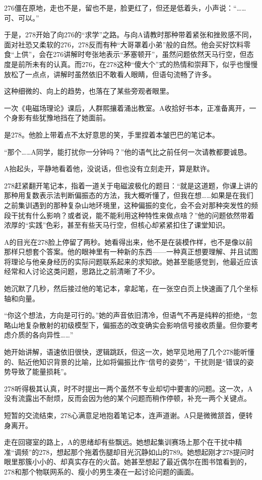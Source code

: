 \documentclass[a4paper]{book}
\begin{document}
276僵在原地，走也不是，留也不是，脸更红了，但还是低着头，小声说：“……可、可以。”

于是，278开始了向276的“求学”之路。与向A请教时那种带着紧张和挫败感不同，面对社恐又柔软的276，278反而有种“大哥罩着小弟”般的自然。他会买好饮料零食“上供”，会在276讲解时夸张地表示“茅塞顿开”，虽然问题依然天马行空，但态度是前所未有的认真。而276，在278这种“傻大个”式的热情和崇拜下，似乎也慢慢放松了一点点，讲解时虽然依旧不敢看人眼睛，但语句流畅了许多。

这种细微的、向上的趋势，也落在了某些旁观者眼里。

一次《电磁场理论》课后，人群熙攘着涌出教室。A收拾好书本，正准备离开，一个身影有些犹豫地挡在了她面前。

是278。他脸上带着点不太好意思的笑，手里捏着本皱巴巴的笔记本。

“那个……A同学，能打扰你一分钟吗？”他的语气比之前任何一次请教都要诚恳。

A抬起头，平静地看着他，没说话，但也没有立刻走开，算是默许。

278赶紧翻开笔记本，指着一道关于电磁波极化的题目：“就是这道题，你课上讲的那种用复数表示法判断偏振态的方法，我大概听懂了，但我在想……如果是在我们之前集训遇到的那种复杂山地环境里，这种偏振的变化，会不会对那种突发性的频段干扰有什么影响？或者说，能不能利用这种特性来做点啥？”他的问题依然带着浓厚的“实践”色彩，甚至有些天马行空，但核心却紧紧扣住了课堂知识。

A的目光在278脸上停留了两秒。她看得出来，他不是在装模作样，也不是像以前那样只想套个答案。他的眼神里有一种新的东西——一种真正想要理解、并且试图将理论与他亲身经历的实际问题联系起来的求知欲。她甚至能感觉到，他最近应该经常和人讨论这类问题，思路比之前清晰了不少。

她沉默了几秒，然后接过他的笔记本，拿起笔，在一张空白页上快速画了几个坐标轴和向量。

“你这个想法，方向是可行的。”她的声音依旧清冷，但语气不再是纯粹的拒绝，“忽略山地复杂散射的初级模型下，偏振态的改变确实会影响信号接收质量。但你要考虑介质的各向异性……”

她开始讲解，语速依旧很快，逻辑跳跃，但这一次，她罕见地用了几个278能听懂的、贴近他知识背景的比喻，比如将偏振比作“信号的姿势”，干扰则是“错误的姿势导致了能量损耗”。

278听得极其认真，时不时提出一两个虽然不专业却切中要害的问题。这一次，A没有流露出不耐烦，反而会因为他的某个问题而稍作停顿，补充一两个关键点。

短暂的交流结束，278心满意足地抱着笔记本，连声道谢。A只是微微颔首，便转身离开。

走在回寝室的路上，A的思绪却有些飘远。她想起集训赛场上那个在干扰中精准“调频”的278，想起那个拖着伤腿却目光沉静如山的789。她想起刚才278提问时眼里那簇小小的、却真实存在的火苗。她甚至想起了最近偶尔在图书馆看到的，278和那个物联网系的、瘦小的男生凑在一起讨论问题的画面。
\end{document}
